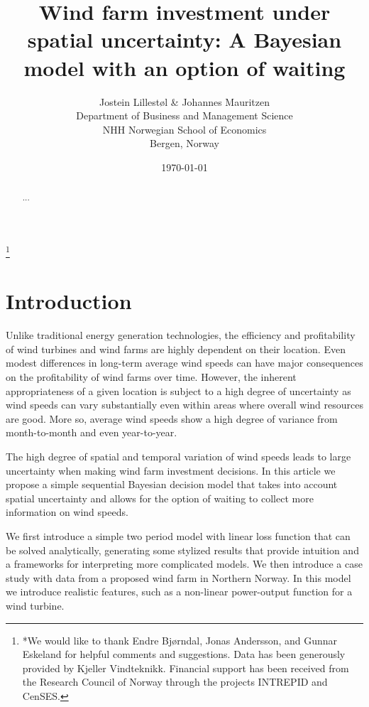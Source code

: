 \documentclass[11pt]{article}
\title{Wind farm investment under spatial uncertainty: A Bayesian model with an option of waiting}
\author{Jostein Lillest\o l \& Johannes Mauritzen\\
 		Department of Business and Management Science\\
   NHH Norwegian School of Economics\\
   Bergen, Norway\\
		}
\date{\today}
\begin{document}
\begin{spacing}{1} %

\maketitle

\begin{abstract}
 ...
\end{abstract}

\thanks{*We would like to thank Endre Bj\o rndal, Jonas Andersson, and Gunnar Eskeland for helpful comments and suggestions. Data has been generously provided by Kjeller Vindteknikk. Financial support has been received from the Research Council of Norway through the projects INTREPID and CenSES.}
\end{spacing}

\section{Introduction}

Unlike traditional energy generation technologies, the efficiency and profitability of wind turbines and wind farms are highly dependent on their location. Even modest differences in long-term average wind speeds can have major consequences on the profitability of wind farms over time. However, the inherent appropriateness of a given location is subject to a high degree of uncertainty as wind speeds can vary substantially even within areas where overall wind resources are good. More so, average wind speeds show a high degree of variance from month-to-month and even year-to-year.

The high degree of spatial and temporal variation of wind speeds leads to large uncertainty when making wind farm investment decisions. In this article we propose a simple sequential Bayesian decision model that takes into account spatial uncertainty and allows for the option of waiting to collect more information on wind speeds.

We first introduce a simple two period model with linear loss function that can be solved analytically, generating some stylized results that provide intuition and a frameworks for interpreting more complicated models. We then introduce a case study with data from a proposed wind farm in Northern Norway. In this model we introduce realistic features, such as a non-linear power-output function for a wind turbine.
\end{document}
